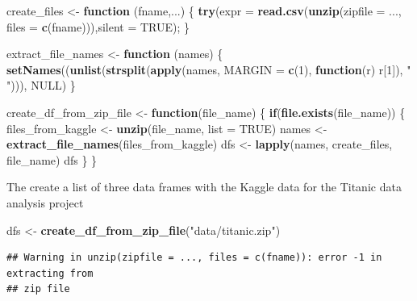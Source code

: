\documentclass[]{article}
\newenvironment{Shaded}{\begin{snugshade}}{\end{snugshade}}
\newcommand{\ControlFlowTok}[1]{\textcolor[rgb]{0.13,0.29,0.53}{\textbf{#1}}}
\newcommand{\DataTypeTok}[1]{\textcolor[rgb]{0.13,0.29,0.53}{#1}}
\newcommand{\DecValTok}[1]{\textcolor[rgb]{0.00,0.00,0.81}{#1}}
\newcommand{\KeywordTok}[1]{\textcolor[rgb]{0.13,0.29,0.53}{\textbf{#1}}}
\newcommand{\NormalTok}[1]{#1}
\newcommand{\OtherTok}[1]{\textcolor[rgb]{0.56,0.35,0.01}{#1}}
\newcommand{\StringTok}[1]{\textcolor[rgb]{0.31,0.60,0.02}{#1}}
\begin{document}
\begin{Shaded}
\begin{Highlighting}[]
\NormalTok{create_files <-}\StringTok{ }\ControlFlowTok{function}\NormalTok{ (fname,...) \{}
    \KeywordTok{try}\NormalTok{(}\DataTypeTok{expr =} \KeywordTok{read.csv}\NormalTok{(}\KeywordTok{unzip}\NormalTok{(}\DataTypeTok{zipfile =}\NormalTok{ ..., }\DataTypeTok{files =} \KeywordTok{c}\NormalTok{(fname))),}\DataTypeTok{silent =} \OtherTok{TRUE}\NormalTok{);}
\NormalTok{\}}

\NormalTok{extract_file_names <-}\StringTok{ }\ControlFlowTok{function}\NormalTok{ (names) \{}
    \KeywordTok{setNames}\NormalTok{((}\KeywordTok{unlist}\NormalTok{(}\KeywordTok{strsplit}\NormalTok{(}\KeywordTok{apply}\NormalTok{(names, }\DataTypeTok{MARGIN =} \KeywordTok{c}\NormalTok{(}\DecValTok{1}\NormalTok{), }\ControlFlowTok{function}\NormalTok{(r) r[}\DecValTok{1}\NormalTok{]), }\StringTok{" "}\NormalTok{))), }\OtherTok{NULL}\NormalTok{)}
\NormalTok{\}}


\NormalTok{create_df_from_zip_file <-}\StringTok{ }\ControlFlowTok{function}\NormalTok{(file_name) \{}
    \ControlFlowTok{if}\NormalTok{(}\KeywordTok{file.exists}\NormalTok{(file_name)) \{}
\NormalTok{        files_from_kaggle <-}\StringTok{ }\KeywordTok{unzip}\NormalTok{(file_name, }\DataTypeTok{list =} \OtherTok{TRUE}\NormalTok{)}
\NormalTok{        names <-}\StringTok{ }\KeywordTok{extract_file_names}\NormalTok{(files_from_kaggle)}
\NormalTok{        dfs <-}\StringTok{ }\KeywordTok{lapply}\NormalTok{(names, create_files, file_name)}
\NormalTok{        dfs}
\NormalTok{    \}}
\NormalTok{\}}
\end{Highlighting}
\end{Shaded}

The create a list of three data frames with the Kaggle data for the
Titanic data analysis project

\begin{Shaded}
\begin{Highlighting}[]
\NormalTok{dfs <-}\StringTok{ }\KeywordTok{create_df_from_zip_file}\NormalTok{(}\StringTok{"data/titanic.zip"}\NormalTok{)}
\end{Highlighting}
\end{Shaded}

\begin{verbatim}
## Warning in unzip(zipfile = ..., files = c(fname)): error -1 in extracting from
## zip file
\end{verbatim}
\end{document}
